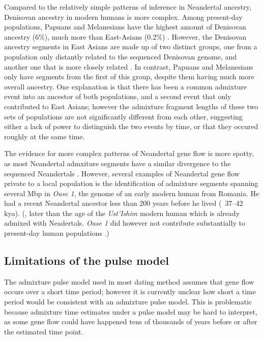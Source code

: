 \documentclass[]{article}
\begin{document}
Compared to the relatively simple patterns of inference in Neandertal ancestry, Denisovan ancestry in modern humans is more complex. Among present-day populations, Papuans and Melanesians have the highest amount of Denisovan ancestry (6\%), much more than East-Asians (0.2\%) \citep{reich_genetic_2010,meyer_high-coverage_2012}.
However, the Denisovan ancestry segments in East Asians are made up of two distinct groups, one from a population only distantly related to the sequenced Denisovan genome, and another one that is more closely related \citep{browning_analysis_2018}. In contrast, Papuans and Melanesians only have segments from the first of this group, despite them having much more overall ancestry.
One explanation is that there has been a common admixture event into an ancestor of both populations, and a second event that only contributed to East Asians; however the admixture fragment lengths of these two sets of populations are not significantly different from each other, suggesting either a lack of power to distinguish the two events by time, or that they occured roughly at the same time\citep{browning_analysis_2018}.



The evidence for more complex patterns of Neandertal gene flow is more spotty, as most Neandertal admxiture segments have a similar divergence to the sequenced Neandertals \cite{browning_analysis_2018}. However, several examples of  Neandertal gene flow private to a local population is the identification of admixture segments spanning several Mbp in \textit{Oase 1}, the genome of an early modern human from Romania. He had a recent Neandertal ancestor less than 200 years before he lived (~37–42 kya). (, later than the age of the \textit{Ust'Ishim} modern human which is already admixed with Neadertals. \textit{Oase 1} did however not contribute substantially to present-day human populations  \citep{fu_genome_2014,fu_early_2015}.)


\subsection{Limitations of the pulse model}\label{Why can't we us the pulse model}

The admixture pulse model used in most dating method assumes that gene flow occurs over a short time period; however it is currently unclear how short a time period would be consistent with an admixture pulse model. This is problematic because admixture time estimates under a pulse model may be hard to interpret, as some gene flow could have happened tens of thousands of years before or after the estimated time point.
\end{document}

